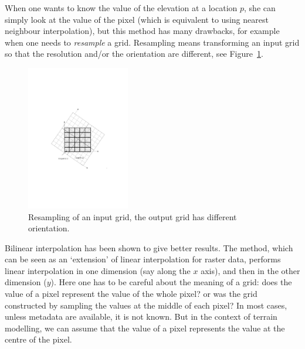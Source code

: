 When one wants to know the value of the elevation at a location $p$, she can simply look at the value of the pixel (which is equivalent to using nearest neighbour interpolation), but this method has many drawbacks, for example when one needs to \emph{resample} a grid. 
Resampling means transforming an input grid so that the resolution and/or the orientation are different, see Figure~\ref{fig:resampling}.
\begin{figure}
  \centering
  \includegraphics[width=0.4\textwidth]{figs/resampling}
  \caption{Resampling of an input grid, the output grid has different orientation.} 
\label{fig:resampling}
\end{figure}

Bilinear interpolation has been shown to give better results. 
The method, which can be seen as an `extension' of linear interpolation for raster data, performs linear interpolation in one dimension (say along the $x$ axis), and then in the other dimension ($y$). 
Here one has to be careful about the meaning of a grid: does the value of a pixel represent the value of the whole pixel? or was the grid constructed by sampling the values at the middle of each pixel? 
In most cases, unless metadata are available, it is not known. 
But in the context of terrain modelling, we can assume that the value of a pixel represents the value at the centre of the pixel.

